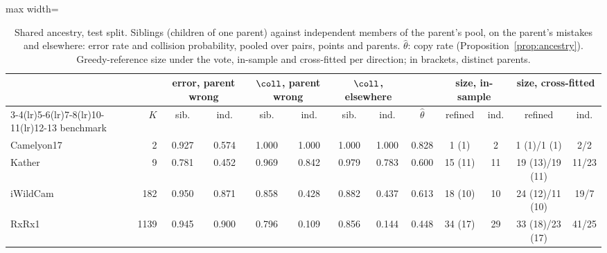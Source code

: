 \begin{table}[t]
\centering
\footnotesize
\caption{Shared ancestry, test split. Siblings (children of one parent) against independent members of the parent's pool, on the parent's mistakes and elsewhere: error rate and collision probability, pooled over pairs, points and parents. $\hat\theta$: copy rate (Proposition~\ref{prop:ancestry}). Greedy-reference size under the vote, in-sample and cross-fitted per direction; in brackets, distinct parents.}
\label{tab:ancestry}
\setlength{\tabcolsep}{3pt}\begin{adjustbox}{max width=\linewidth}
\begin{tabular}{lrccccccccccc}
\toprule
& & \multicolumn{2}{c}{error, parent wrong} & \multicolumn{2}{c}{$\coll$, parent wrong} & \multicolumn{2}{c}{$\coll$, elsewhere} & & \multicolumn{2}{c}{size, in-sample} & \multicolumn{2}{c}{size, cross-fitted} \\ \cmidrule(lr){3-4}\cmidrule(lr){5-6}\cmidrule(lr){7-8}\cmidrule(lr){10-11}\cmidrule(lr){12-13} benchmark & $K$ & sib. & ind. & sib. & ind. & sib. & ind. & $\hat\theta$ & refined & ind. & refined & ind. \\
\midrule
Camelyon17 & 2 & 0.927 & 0.574 & 1.000 & 1.000 & 1.000 & 1.000 & 0.828 & 1 (1) & 2 & 1 (1)/1 (1) & 2/2 \\
Kather & 9 & 0.781 & 0.452 & 0.969 & 0.842 & 0.979 & 0.783 & 0.600 & 15 (11) & 11 & 19 (13)/19 (11) & 11/23 \\
iWildCam & 182 & 0.950 & 0.871 & 0.858 & 0.428 & 0.882 & 0.437 & 0.613 & 18 (10) & 10 & 24 (12)/11 (10) & 19/7 \\
RxRx1 & 1139 & 0.945 & 0.900 & 0.796 & 0.109 & 0.856 & 0.144 & 0.448 & 34 (17) & 29 & 33 (18)/23 (17) & 41/25 \\
\bottomrule
\end{tabular}
\end{adjustbox}
\end{table}
